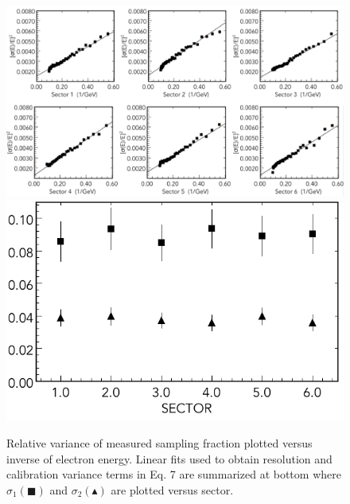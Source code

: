 \begin{figure}[t]
\centering
\includegraphics[width=1.0\columnwidth,keepaspectratio]{img/S10_1_1.png}
\includegraphics[width=0.5\columnwidth,keepaspectratio]{img/S10_1_2.png}
\caption[]{Relative variance of measured sampling fraction plotted versus inverse of electron energy.  Linear fits used to obtain resolution and calibration variance terms in Eq. 7 are summarized at bottom where $\sigma_1 (\blacksquare)$ and $\sigma_2 (\blacktriangle)$ are plotted versus sector.}
\label{fig:S10_1_1}
\end{figure}

